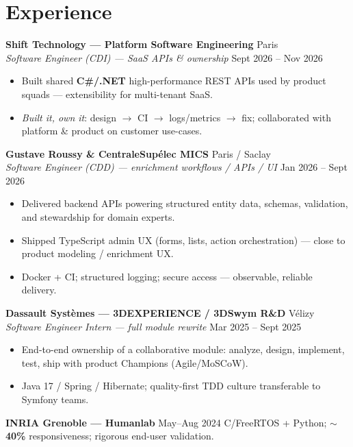 \documentclass[10pt,a4paper]{article}
\begin{document}
\section{Experience}
\textbf{Shift Technology --- Platform Software Engineering} \hfill Paris\\
\textit{Software Engineer (CDI) --- SaaS APIs \& ownership} \hfill Sept 2026 -- Nov 2026
\begin{itemize}
  \item Built shared \textbf{C\#/.NET} high-performance REST APIs used by product squads --- extensibility for multi-tenant SaaS.
  \item \textit{Built it, own it}: design $\rightarrow$ CI $\rightarrow$ logs/metrics $\rightarrow$ fix; collaborated with platform \& product on customer use-cases.
\end{itemize}

\textbf{Gustave Roussy \& CentraleSup\'elec MICS} \hfill Paris / Saclay\\
\textit{Software Engineer (CDD) --- enrichment workflows / APIs / UI} \hfill Jan 2026 -- Sept 2026
\begin{itemize}
  \item Delivered backend APIs powering structured entity data, schemas, validation, and stewardship for domain experts.
  \item Shipped TypeScript admin UX (forms, lists, action orchestration) --- close to product modeling / enrichment UX.
  \item Docker + CI; structured logging; secure access --- observable, reliable delivery.
\end{itemize}

\textbf{Dassault Syst\`emes --- 3DEXPERIENCE / 3DSwym R\&D} \hfill V\'elizy\\
\textit{Software Engineer Intern --- full module rewrite} \hfill Mar 2025 -- Sept 2025
\begin{itemize}
  \item End-to-end ownership of a collaborative module: analyze, design, implement, test, ship with product Champions (Agile/MoSCoW).
  \item Java 17 / Spring / Hibernate; quality-first TDD culture transferable to Symfony teams.
\end{itemize}

\textbf{INRIA Grenoble --- Humanlab} \hfill May--Aug 2024 \quad C/FreeRTOS + Python; \textbf{$\sim$40\%} responsiveness; rigorous end-user validation.
\end{document}
